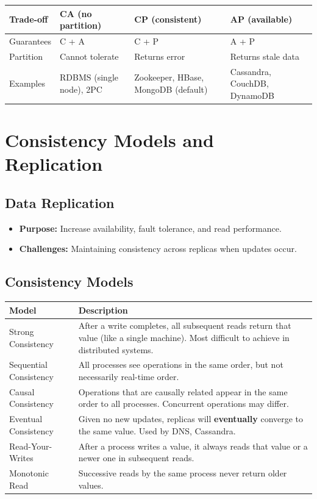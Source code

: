 \documentclass[11pt,a4paper]{article}
\begin{document}
\begin{longtable}{@{}p{2.8cm}p{3.8cm}p{3.8cm}p{3.8cm}@{}}
\toprule
\rowcolor{primary!15}
\textbf{Trade-off} & \textbf{CA (no partition)} & \textbf{CP (consistent)} & \textbf{AP (available)} \\
\midrule
\endhead
Guarantees & C + A & C + P & A + P \\
Partition & Cannot tolerate & Returns error & Returns stale data \\
Examples & RDBMS (single node), 2PC & Zookeeper, HBase, MongoDB (default) & Cassandra, CouchDB, DynamoDB \\
\bottomrule
\end{longtable}

\section{Consistency Models and Replication}

\subsection{Data Replication}
\begin{itemize}[leftmargin=*, itemsep=3pt]
  \item \textbf{Purpose:} Increase availability, fault tolerance, and read performance.
  \item \textbf{Challenges:} Maintaining consistency across replicas when updates occur.
\end{itemize}

\subsection{Consistency Models}

\begin{longtable}{@{}p{3.8cm}p{9.5cm}@{}}
\toprule
\rowcolor{primary!15}
\textbf{Model} & \textbf{Description} \\
\midrule
\endhead
Strong Consistency & After a write completes, all subsequent reads return that value (like a single machine). Most difficult to achieve in distributed systems. \\
Sequential Consistency & All processes see operations in the same order, but not necessarily real-time order. \\
Causal Consistency & Operations that are causally related appear in the same order to all processes. Concurrent operations may differ. \\
Eventual Consistency & Given no new updates, replicas will \textbf{eventually} converge to the same value. Used by DNS, Cassandra. \\
Read-Your-Writes & After a process writes a value, it always reads that value or a newer one in subsequent reads. \\
Monotonic Read & Successive reads by the same process never return older values. \\
\bottomrule
\end{longtable}
\end{document}
